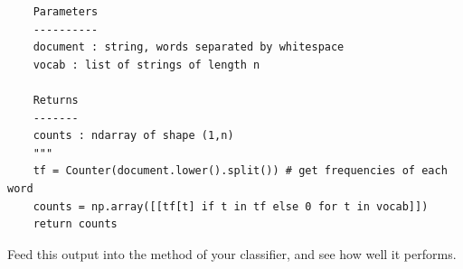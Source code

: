 \begin{problem}
\begin{lstlisting}
    Parameters
    ----------
    document : string, words separated by whitespace
    vocab : list of strings of length n

    Returns
    -------
    counts : ndarray of shape (1,n)
    """
    tf = Counter(document.lower().split()) # get frequencies of each word
    counts = np.array([[tf[t] if t in tf else 0 for t in vocab]])
    return counts
\end{lstlisting}
Feed this output into the  method of your classifier, and see how well it performs.
\end{problem}

